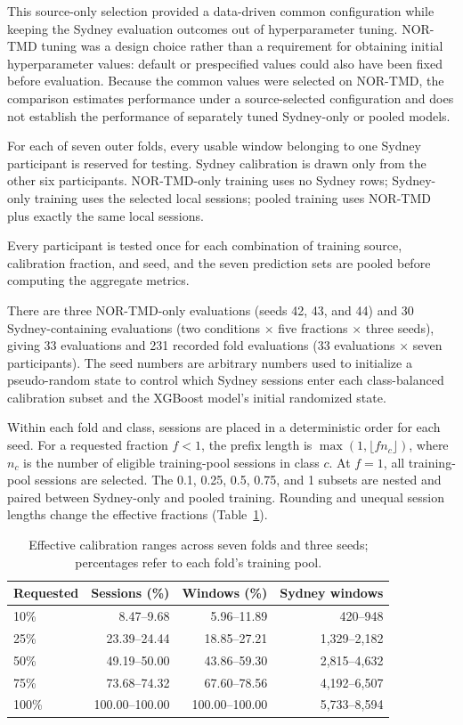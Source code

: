 This source-only selection provided a data-driven common configuration while keeping the Sydney evaluation outcomes out of hyperparameter tuning. NOR-TMD tuning was a design choice rather than a requirement for obtaining initial hyperparameter values: default or prespecified values could also have been fixed before evaluation. Because the common values were selected on NOR-TMD, the comparison estimates performance under a source-selected configuration and does not establish the performance of separately tuned Sydney-only or pooled models.

For each of seven outer folds, every usable window belonging to one Sydney participant is reserved for testing. Sydney calibration is drawn only from the other six participants. NOR-TMD-only training uses no Sydney rows; Sydney-only training uses the selected local sessions; pooled training uses NOR-TMD plus exactly the same local sessions.

Every participant is tested once for each combination of training source, calibration fraction, and seed, and the seven prediction sets are pooled before computing the aggregate metrics.

There are three NOR-TMD-only evaluations (seeds 42, 43, and 44) and 30 Sydney-containing evaluations (two conditions $\times$ five fractions $\times$ three seeds), giving 33 evaluations and 231 recorded fold evaluations (33 evaluations $\times$ seven participants). The seed numbers are arbitrary numbers used to initialize a pseudo-random state to control which Sydney sessions enter each class-balanced calibration subset and the XGBoost model’s initial randomized state.

Within each fold and class, sessions are placed in a deterministic order for each seed. For a requested fraction $f<1$, the prefix length is $\max(1,\lfloor f n_c\rfloor)$, where $n_c$ is the number of eligible training-pool sessions in class $c$. At $f=1$, all training-pool sessions are selected. The 0.1, 0.25, 0.5, 0.75, and 1 subsets are nested and paired between Sydney-only and pooled training. Rounding and unequal session lengths change the effective fractions (Table~\ref{tab:transfer-effective}).

\begin{table}[htbp]
\centering
\small
\caption{Effective calibration ranges across seven folds and three seeds; percentages refer to each fold's training pool.}
\label{tab:transfer-effective}
\begin{tabular}{lrrr}
\hline
Requested & Sessions (\%) & Windows (\%) & Sydney windows \\
\hline
10\% & 8.47--9.68 & 5.96--11.89 & 420--948 \\
25\% & 23.39--24.44 & 18.85--27.21 & 1,329--2,182 \\
50\% & 49.19--50.00 & 43.86--59.30 & 2,815--4,632 \\
75\% & 73.68--74.32 & 67.60--78.56 & 4,192--6,507 \\
100\% & 100.00--100.00 & 100.00--100.00 & 5,733--8,594 \\
\hline
\end{tabular}
\end{table}
